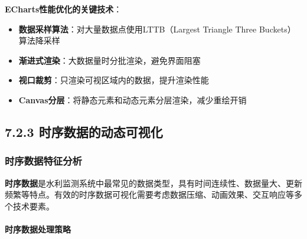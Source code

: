 \textbf{ECharts性能优化的关键技术}：

\begin{itemize}
\tightlist
\item
  \textbf{数据采样算法}：对大量数据点使用LTTB（Largest Triangle Three Buckets）算法降采样
\item
  \textbf{渐进式渲染}：大数据量时分批渲染，避免界面阻塞
\item
  \textbf{视口裁剪}：只渲染可视区域内的数据，提升渲染性能
\item
  \textbf{Canvas分层}：将静态元素和动态元素分层渲染，减少重绘开销
\end{itemize}

\subsection{7.2.3 时序数据的动态可视化}\label{ux65f6ux5e8fux6570ux636eux7684ux52a8ux6001ux53efux89c6ux5316}

\subsubsection{时序数据特征分析}\label{ux65f6ux5e8fux6570ux636eux7279ux5f81ux5206ux6790}

\textbf{时序数据}是水利监测系统中最常见的数据类型，具有时间连续性、数据量大、更新频繁等特点。有效的时序数据可视化需要考虑数据压缩、动画效果、交互响应等多个技术要素。

\paragraph{时序数据处理策略}\label{ux65f6ux5e8fux6570ux636eux5904ux7406ux7b56ux7565}

